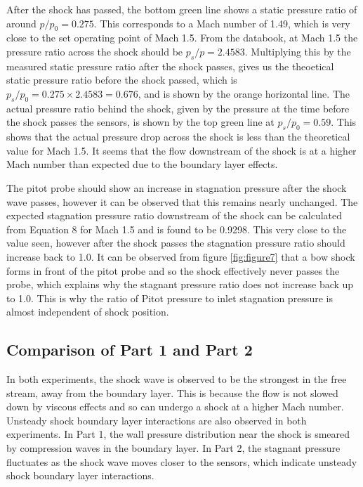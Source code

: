 \documentclass{article}
\begin{document}
After the shock has passed, the bottom green line shows a static pressure ratio of around $p/p_0 = 0.275$. This corresponds to a Mach number of 1.49, which is very close to the set operating point of Mach 1.5.
From the databook, at Mach 1.5 the pressure ratio across the shock should be $p_s/p = 2.4583$.
Multiplying this by the measured static pressure ratio after the shock passes, gives us the theoetical static pressure ratio before the shock passed, which is $p_s/p_0 = 0.275 \times 2.4583 = 0.676$, and is shown by the orange horizontal line.
The actual pressure ratio behind the shock, given by the pressure at the time before the shock passes the sensors, is shown by the top green line at $p_s/p_0 = 0.59$.
This shows that the actual pressure drop across the shock is less than the theoretical value for Mach 1.5.
It seems that the flow downstream of the shock is at a higher Mach number than expected due to the boundary layer effects.

The pitot probe should show an increase in stagnation pressure after the shock wave passes, however it can be observed that this remains nearly unchanged.
The expected stagnation pressure ratio downstream of the shock can be calculated from Equation 8 for Mach 1.5 and is found to be 0.9298. This very close to the value seen, however after the shock passes the stagnation pressure ratio should increase back to 1.0.
It can be observed from figure \ref{fig:figure7} that a bow shock forms in front of the pitot probe and so the shock effectively never passes the probe, which explains why the stagnant pressure ratio does not increase back up to 1.0.
This is why the ratio of Pitot pressure to inlet stagnation pressure is almost independent of shock position.

\subsection{Comparison of Part 1 and Part 2}

In both experiments, the shock wave is observed to be the strongest in the free stream, away from the boundary layer.
This is because the flow is not slowed down by viscous effects and so can undergo a shock at a higher Mach number.
Unsteady shock boundary layer interactions are also observed in both experiments.
In Part 1, the wall pressure distribution near the shock is smeared by compression waves in the boundary layer.
In Part 2, the stagnant pressure fluctuates as the shock wave moves closer to the sensors, which indicate unsteady shock boundary layer interactions.
\end{document}
